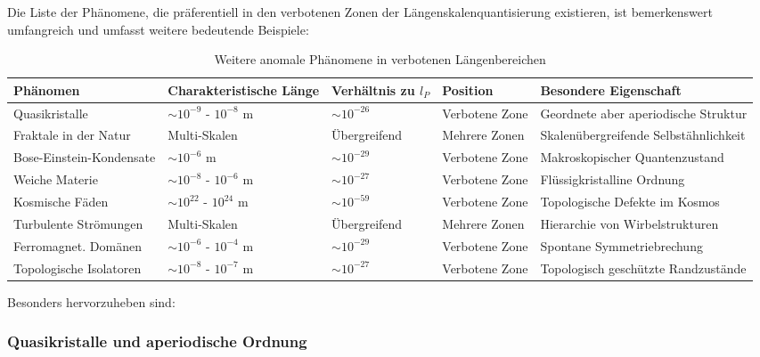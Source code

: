 \documentclass[12pt,a4paper]{article}
\begin{document}
	Die Liste der Phänomene, die präferentiell in den \glqq verbotenen Zonen\grqq{} der Längen\-skalen\-quantisierung existieren, ist bemerkenswert umfangreich und umfasst weitere bedeutende Beispiele:
	
	\begin{table}[h]
		\centering
		\begin{adjustbox}{scale=0.65}
			\begin{tabular}{lllll}
				\hline
				\textbf{Phänomen} & \textbf{Charakteristische Länge} & \textbf{Verhältnis zu $l_P$} & \textbf{Position} & \textbf{Besondere Eigenschaft} \\
				\hline
				Quasikristalle & $\sim 10^{-9}$ - $10^{-8}$ m & $\sim 10^{-26}$ & Verbotene Zone & Geordnete aber aperiodische Struktur \\
				Fraktale in der Natur & Multi-Skalen & Übergreifend & Mehrere Zonen & Skalenübergreifende Selbstähnlichkeit \\
				Bose-Einstein-Kondensate & $\sim 10^{-6}$ m & $\sim 10^{-29}$ & Verbotene Zone & Makroskopischer Quantenzustand \\
				Weiche Materie & $\sim 10^{-8}$ - $10^{-6}$ m & $\sim 10^{-27}$ & Verbotene Zone & Flüssigkristalline Ordnung \\
				Kosmische Fäden & $\sim 10^{22}$ - $10^{24}$ m & $\sim 10^{-59}$ & Verbotene Zone & Topologische Defekte im Kosmos \\
				Turbulente Strömungen & Multi-Skalen & Übergreifend & Mehrere Zonen & Hierarchie von Wirbelstrukturen \\
				Ferromagnet. Domänen & $\sim 10^{-6}$ - $10^{-4}$ m & $\sim 10^{-29}$ & Verbotene Zone & Spontane Symmetriebrechung \\
				Topologische Isolatoren & $\sim 10^{-8}$ - $10^{-7}$ m & $\sim 10^{-27}$ & Verbotene Zone & Topologisch geschützte Randzustände \\
				\hline
			\end{tabular}
		\end{adjustbox}
		\caption{Weitere anomale Phänomene in verbotenen Längenbereichen}
		\label{tab:more_anomalies}
	\end{table}
	
	Besonders hervorzuheben sind:
	
	\subsubsection{Quasikristalle und aperiodische Ordnung}
	\label{subsubsec:quasikristalle}
	
\end{document}
